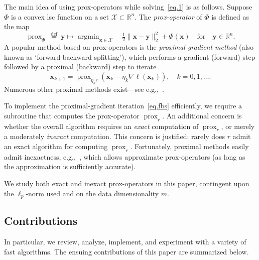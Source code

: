 \documentclass[twoside,11pt]{article}
\newcommand{\vx}{\bm{x}}       \newcommand{\vxh}{\hat{\bm{x}}}        \newcommand{\xh}{\hat{x}}    \newcommand{\vxt}{\tilde{\bm{x}}}       \newcommand{\xt}{\tilde{x}}
\newcommand{\vy}{\bm{y}}       \newcommand{\vyh}{\hat{\bm{y}}}        \newcommand{\yh}{\hat{y}}    \newcommand{\vyt}{\tilde{\bm{y}}}       \newcommand{\yt}{\tilde{y}}
\newcommand{\Xc}{\mathcal{X}}
\newcommand{\mynorm}[2]{\| {#1} \|_{#2}}
\newcommand{\enorm}[1]{\mynorm{#1}{2}}
\DeclareMathOperator*{\argmin}{argmin}
\DeclareMathOperator{\prox}{prox}
\newcommand{\defeq}{\ \stackrel{\text{def}}{=}\ }
\newcommand{\reals}{\mathbb{R}}
\newcommand{\half}{\tfrac{1}{2}}
\numberwithin{equation}{section}
\numberwithin{theorem}{section}
\begin{document}
The main idea of using prox-operators while solving~\eqref{eq.1} is as follows. Suppose $\Phi$ is a convex lsc function on a set $\Xc \subset \reals^n$. The \emph{prox-operator} of $\Phi$ is defined as the map
\begin{equation}
  \label{eq.2}
  \prox_\Phi \defeq \vy \mapsto  \argmin_{\vx \in \Xc}\quad \half\enorm{\vx-\vy}^2 + \Phi(\vx)\quad\text{for}\quad \vy \in \reals^n.
\end{equation}
A popular method based on prox-operators is the
\emph{proximal gradient method} (also known as `forward backward splitting'), which performs a gradient (forward) step followed by a proximal (backward) step to iterate
\begin{equation}
  \label{eq.fbs}
  \vx_{k+1} = \prox_{\eta_kr}(\vx_k - \eta_k\nabla\ell(\vx_k)),\quad k=0,1,\ldots.
\end{equation}
Numerous other proximal methods exist---see e.g.,~\citep{fista,nest07,Combettes09,KimICML10,schmidt11}.

To implement the proximal-gradient iteration~\eqref{eq.fbs} efficiently, we require a subroutine that computes the prox-operator $\prox_r$. An additional concern is whether the overall algorithm requires an \emph{exact} computation of $\prox_r$, or merely a moderately \emph{inexact} computation. This concern is justified: rarely does $r$ admit an exact algorithm for computing $\prox_r$. Fortunately, proximal methods easily admit inexactness, e.g.,~\citep{schmidt11,salzo,nocops}, which allows approximate prox-operators (as long as the approximation is sufficiently accurate).

We study both exact and inexact prox-operators in this paper, contingent upon the $\ell_p$-norm used and on the data dimensionality $m$.

\subsection{Contributions}
In particular, we review, analyze, implement, and experiment with a variety of fast algorithms. The ensuing contributions of this paper are summarized below.
\end{document}
